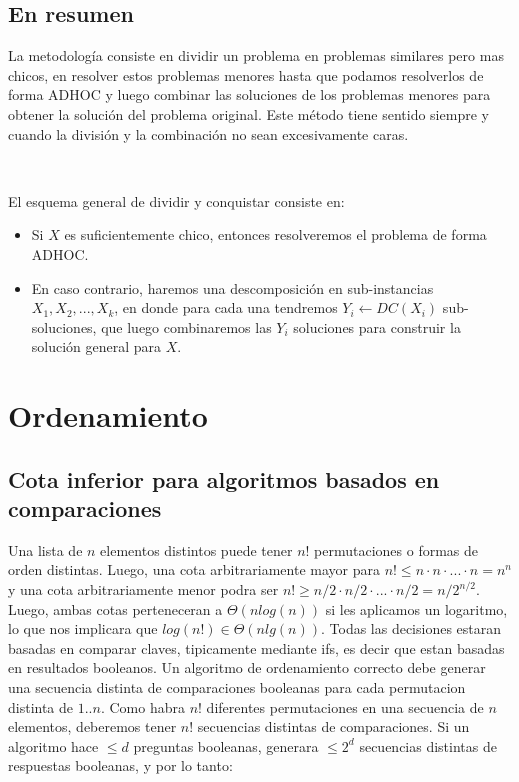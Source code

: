 \documentclass[10pt, a4paper]{report}
\begin{document}
\subsection{En resumen}

La metodolog\'ia consiste en dividir un problema en problemas similares pero mas chicos, en resolver estos problemas menores hasta que podamos resolverlos de forma ADHOC y luego combinar las soluciones de los problemas menores para obtener la soluci\'on del problema original. Este m\'etodo tiene sentido siempre y cuando la divisi\'on y la combinaci\'on no sean excesivamente caras.

~

El esquema general de dividir y conquistar consiste en:

\begin{itemize}
 \item Si $X$ es suficientemente chico, entonces resolveremos el problema de forma ADHOC.
 \item En caso contrario, haremos una descomposici\'on en sub-instancias $X_1, X_2, ..., X_k$, en donde para cada una tendremos $Y_i \gets DC(X_i)$ sub-soluciones, que luego combinaremos las $Y_i$ soluciones para construir la soluci\'on general para $X$.
\end{itemize}

\newpage

\section{Ordenamiento}

\subsection{Cota inferior para algoritmos basados en comparaciones}

Una lista de $n$ elementos distintos puede tener $n!$ permutaciones o formas de orden distintas. Luego, una cota arbitrariamente mayor para $n! \leq n \cdot n \cdot ... \cdot n = n^n$ y una cota arbitrariamente menor podra ser $n! \geq n/2 \cdot n/2 \cdot ... \cdot n/2 = n/2^{n/2}$. Luego, ambas cotas perteneceran a $\Theta(n log(n))$ si les aplicamos un logaritmo, lo que nos implicara que $log(n!) \in \Theta(n lg(n))$.
Todas las decisiones estaran basadas en comparar claves, tipicamente mediante ifs, es decir que estan basadas en resultados booleanos. Un algoritmo de ordenamiento correcto debe generar una secuencia distinta de comparaciones booleanas para cada permutacion distinta de $1.. n$. Como habra $n!$ diferentes permutaciones en una secuencia de $n$ elementos, deberemos tener $n!$ secuencias distintas de comparaciones. Si un algoritmo hace $\leq d$ preguntas booleanas, generara $\leq 2^d$ secuencias distintas de respuestas booleanas, y por lo tanto:
\end{document}
